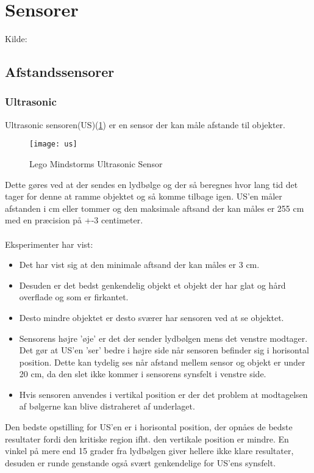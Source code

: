 \section{Sensorer}
Kilde: \cite{tikNXT}
\subsection{Afstandssensorer}
\subsubsection{Ultrasonic}
Ultrasonic sensoren(US)(\ref{sensor:ultrasonic_sensor}) er en sensor der kan måle afstande til objekter.

\begin{figure}[h]
\centering
\texttt{[image: us]}
\caption{Lego Mindstorms Ultrasonic Sensor}
\label{sensor:ultrasonic_sensor}
\end{figure}

Dette gøres ved at der sendes en lydbølge og der så beregnes hvor lang tid det tager for denne at ramme objektet og så komme tilbage igen.
US'en måler afstanden i cm eller tommer og den maksimale aftsand der kan måles er 255 cm med en præcision på +-3 centimeter.
\\
\\
Eksperimenter\cite{tikNXT} har vist:
\begin{itemize}
\item Det har vist sig at den minimale aftsand der kan måles er 3 cm.
\item Desuden er det bedst genkendelig objekt et objekt der har glat og hård overflade og som er firkantet.
\item Desto mindre objektet er desto sværer har sensoren ved at se objektet.
\item Sensorens højre 'øje' er det der sender lydbølgen mens det venstre modtager.
Det gør at US'en 'ser' bedre i højre side når sensoren befinder sig i horisontal position.
Dette kan tydelig ses når afstand mellem sensor og objekt er under 20 cm, da den slet ikke kommer i sensorens synsfelt i venstre side.
\item Hvis sensoren anvendes i vertikal position er der det problem at modtagelsen af bølgerne kan blive distraheret af underlaget.
\end{itemize}

Den bedste opstilling for US'en er i horisontal position, der opnåes de bedste resultater fordi den kritiske region ifht. den vertikale position er mindre.
En vinkel på mere end 15 grader fra lydbølgen giver hellere ikke klare resultater, desuden er runde genstande også svært genkendelige for US'ens synsfelt.


